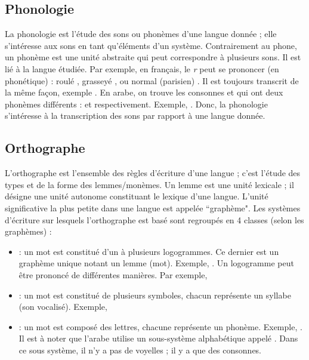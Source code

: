 \documentclass{KodeBook}
\begin{document}
\subsection{Phonologie}

La phonologie est l'étude des sons ou phonèmes d'une langue donnée ; elle s'intéresse aux sons en tant qu'éléments d'un système. 
Contrairement au phone, un phonème est une unité abstraite qui peut correspondre à plusieurs sons.
Il est lié à la langue étudiée. 
Par exemple, en français, le \textit{r} peut se prononcer (en phonétique) : roulé \expword{\textipa{[r]}}, grasseyé \expword{\textipa{[\;R]}}, ou normal (parisien) \expword{\textipa{[K]}}. 
Il est toujours transcrit de la même façon, exemple . 
En arabe, on trouve les consonnes  et  qui ont deux phonèmes différents :  et  respectivement. 
Exemple, . 
Donc, la phonologie s'intéresse à la transcription des sons par rapport à une langue donnée.

\subsection{Orthographe}

L'orthographe est l'ensemble des règles d'écriture d'une langue ; c'est l'étude des types et de la forme des lemmes/monèmes. 
Un lemme est une unité lexicale ; il désigne une unité autonome constituant le lexique d'une langue.
L'unité significative la plus petite dans une langue est appelée ``graphème".
Les systèmes d'écriture sur lesquels l'orthographe est basé sont regroupés en 4 classes (selon les graphèmes) : 
\begin{itemize}
	\item {} : un mot est constitué d'un à plusieurs logogrammes.
	Ce dernier est un graphème unique notant un lemme (mot).
	Exemple, .
	Un logogramme peut être prononcé de différentes manières. 
	Par exemple, 
	
	\item {} : un mot est constitué de plusieurs symboles, chacun représente un syllabe (son vocalisé). 
	Exemple, 
	\item {} : un mot est composé des lettres, chacune représente un phonème. 
	Exemple, . 
	Il est à noter que l'arabe utilise un sous-système alphabétique appelé . 
	Dans ce sous système, il n'y a pas de voyelles ; il y a que des consonnes.
\end{itemize}
\end{document}

